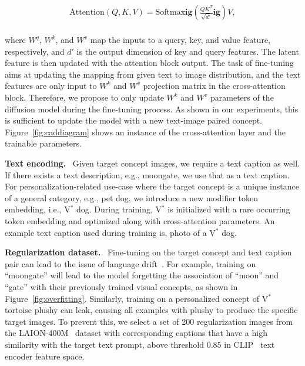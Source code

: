 \begin{equation}
    \begin{aligned}
    \text{Attention}(Q, K, V) = \text{Softmax}\mathbf{ig}(\frac{QK^T}{\sqrt{d'}} \mathbf{ig})V, \\
    \end{aligned}\label{eq:objective}
\end{equation}

 where $W^q$, $W^k$, and $W^v$ map the inputs to a query, key, and value feature, respectively, and $d'$ is the output dimension of key and query features. The latent feature is then updated with the attention block output. The task of fine-tuning aims at updating the mapping from given text to image distribution, and the text features are only input to $W^k$ and $W^v$ projection matrix in the cross-attention block. Therefore, we propose to only update $W^{k}$ and $W^{v}$ parameters of the diffusion model during the fine-tuning process. As shown in our experiments, this is sufficient to update the model with a new text-image paired concept. Figure~\ref{fig:caddiagram} shows an instance of the cross-attention layer and the trainable parameters.

  \textbf{Text encoding.} \ 
Given target concept images, we require a text caption as well. If there exists a text description, e.g., {\menlo moongate}, we use that as a text caption. For personalization-related use-case where the target concept is a unique instance of a general category, e.g., pet dog, we introduce a new modifier token embedding, i.e., {\menlo V$^*$ dog}. During training, {\menlo V$^*$} is initialized with a rare occurring token embedding and optimized along with cross-attention parameters. An example text caption used during training is, {\menlo photo of a V$^{*}$ dog}. 

  \textbf{Regularization dataset.} \ 
Fine-tuning on the target concept and text caption pair can lead to the issue of language drift~\cite{lee2019countering,lu2020countering}. For example, training on  ``moongate'' will lead to the model forgetting the association of ``moon'' and ``gate'' with their previously trained visual concepts, as shown in Figure~\ref{fig:overfitting}. Similarly, training on a personalized concept of {\menlo V$^{*}$ tortoise plushy} can leak, causing all examples with {\menlo plushy} to produce the specific target images. To prevent this, we select a set of 200 regularization images from the LAION-400M~\cite{schuhmann2021laion} dataset with corresponding captions that have a high similarity with the target text prompt, above threshold $0.85$ in CLIP~\cite{radford2021learning} text encoder feature space. 

